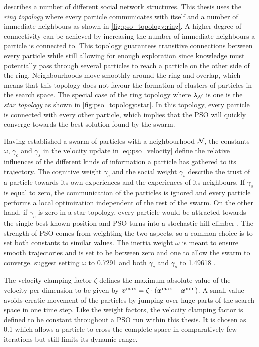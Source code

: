 \citeauthor{engelbrecht_fundamentals_2006} describes a number of different social network structures.
This thesis uses the \emph{ring topology} where every particle communicates with itself and a number of immediate neighbours as shown in \cref{fig:pso_topology:ring}.
A higher degree of connectivity can be achieved by increasing the number of immediate neighbours a particle is connected to.
This topology guarantees transitive connections between every particle while still allowing for enough exploration since knowledge must potentially pass through several particles to reach a particle on the other side of the ring.
Neighbourhoods move smoothly around the ring and overlap, which means that this topology does not favour the formation of clusters of particles in the search space.
The special case of the ring topology where $\lambda_{\operatorname{\mathcal{N}}}$ is one is the \emph{star topology} as shown in \cref{fig:pso_topology:star}.
In this topology, every particle is connected with every other particle, which implies that the PSO will quickly converge towards the best solution found by the swarm.

Having established a swarm of particles with a neighbourhood $\operatorname{\mathcal{N}}$, the constants $\omega$, $\gamma_c$ and $\gamma_s$ in the velocity update in \cref{eq:pso_velocity} define the relative influences of the different kinds of information a particle has gathered to its trajectory.
The cognitive weight $\gamma_c$ and the social weight $\gamma_s$ describe the trust of a particle towards its own experiences and the experiences of its neighbours.
If $\gamma_s$ is equal to zero, the communication of the particles is ignored and every particle performs a local optimization independent of the rest of the swarm.
On the other hand, if $\gamma_c$ is zero in a star topology, every particle would be attracted towards the single best known position and PSO turns into a stochastic hill-climber \cite{engelbrecht_fundamentals_2006}.
The strength of PSO comes from weighting the two aspects, so a common choice is to set both constants to similar values.
The inertia weight $\omega$ is meant to ensure smooth trajectories and is set to be between zero and one to allow the swarm to converge.
\citeauthor{eberhart_comparing_2000} suggest setting $\omega$ to 0.7291 and both $\gamma_c$ and $\gamma_s$ to 1.49618 \cite{eberhart_comparing_2000,clerc_swarm_1999}.

The velocity clamping factor $\zeta$ defines the maximum absolute value of the velocity per dimension to be given by $\bm{v^\text{max}} = \zeta \cdot ( \bm{x^\text{max}} - \bm{x^\text{min}} )$.
A small value avoids erratic movement of the particles by jumping over huge parts of the search space in one time step.
Like the weight factors, the velocity clamping factor is defined to be constant throughout a PSO run within this thesis.
It is chosen as 0.1 which allows a particle to cross the complete space in comparatively few iterations but still limits its dynamic range.


